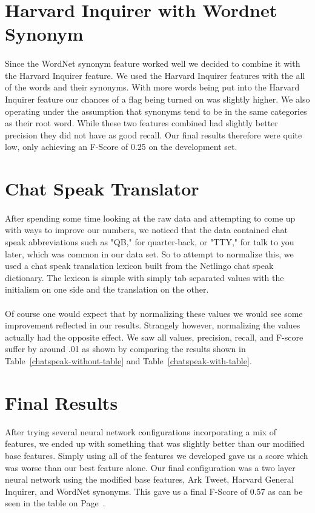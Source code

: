 \documentclass[11pt,letterpaper]{article}
\begin{document}
\section{Harvard Inquirer with Wordnet Synonym}
\paragraph{}
Since the WordNet synonym feature worked well we decided to combine it with the Harvard Inquirer feature. We used the Harvard Inquirer features with the all of the words and their synonyms. With more words being put into the Harvard Inquirer feature our chances of a flag being turned on was slightly higher. We also operating under the assumption that synonyms tend to be in the same categories as their root word. While these two features combined had slightly better precision they did not have as good recall. Our final results therefore were quite low, only achieving an F-Score of 0.25 on the development set.

\section{Chat Speak Translator}
\paragraph{}
After spending some time looking at the raw data and attempting to come up with ways to improve our numbers, we noticed that the data contained chat speak abbreviations such as "QB," for quarter-back, or "TTY," for talk to you later, which was common in our data set. So to attempt to normalize this, we used a chat speak translation lexicon built from the Netlingo chat speak dictionary. The lexicon is simple with simply tab separated values with the initialism on one side and the translation on the other.
\paragraph{}
Of course one would expect that by normalizing these values we would see some improvement reflected in our results. Strangely however, normalizing the values actually had the opposite effect. We saw all values, precision, recall, and F-score suffer by around .01 as shown by comparing the results shown in Table~\ref{chatspeak-without-table} and Table~\ref{chatspeak-with-table}.

\section{Final Results}
After trying several neural network configurations incorporating a mix of features, we ended up with something that was slightly better than our modified base features. Simply using all of the features we developed gave us a score which was worse than our best feature alone. Our final configuration was a two layer neural network using the modified base features, Ark Tweet, Harvard General Inquirer, and WordNet synonyms. This gave us a final F-Score of 0.57 as can be seen in the table on Page~\pageref{SemEval2015-Results}.
\end{document}
